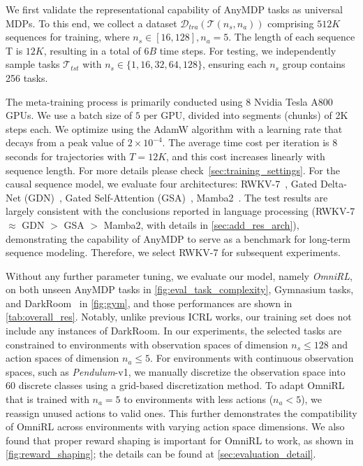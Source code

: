 \documentclass{article}
\renewcommand{\cite}[1]{\citep{#1}}
\begin{document}
We first validate the representational capability of AnyMDP tasks as universal MDPs. To this end, we collect a dataset $\mathcal{D}_{tra}(\mathcal{T}(n_s,n_a))$ comprising $512K$ sequences for training, where  $n_s\in[16, 128], n_a=5$. The length of each sequence T is $12K$, resulting in a total of $6B$ time steps. For testing, we independently sample tasks $\mathcal{T}_{tst}$ with $n_s\in\{1, 16, 32, 64, 128\}$, ensuring each $n_s$ group contains 256 tasks. 

The meta-training process is primarily conducted using 8 Nvidia Tesla A800 GPUs. We use a batch size of $5$ per GPU, divided into segments (chunks) of 2K steps each. We optimize using the AdamW algorithm with a learning rate that decays from a peak value of $2\times10^{-4}$. The average time cost per iteration is $8$ seconds for trajectories with $T=12K$, and this cost increases linearly with sequence length. For more details please check~\cref{sec:training_settings}. For the causal sequence model, we evaluate four architectures: RWKV-7~\cite{peng2025rwkv}, Gated Delta-Net (GDN)~\cite{yang2025gated}, Gated Self-Attention (GSA)~\cite{zhanggated}, Mamba2~\cite{dao2024transformers}. 
The test results are largely consistent with the conclusions reported in language processing (RWKV-7 $\approx$ GDN $>$  GSA $>$ Mamba2, with details in \cref{sec:add_res_arch}), demonstrating the capability of AnyMDP to serve as a benchmark for long-term sequence modeling. Therefore, we select RWKV-7 for subsequent experiments.

Without any further parameter tuning, we evaluate our model, namely \emph{OmniRL}, on both unseen AnyMDP tasks in \cref{fig:eval_task_complexity}, Gymnasium tasks, and DarkRoom~\cite{laskin2022context} in \cref{fig:gym}, and those performances are shown in \cref{tab:overall_res}. Notably, unlike previous ICRL works, our training set does not include any instances of DarkRoom. In our experiments, the selected tasks are constrained to environments with observation spaces of dimension $n_s \leq 128$ and action spaces of dimension $n_a \leq 5$. For environments with continuous observation spaces, such as \emph{Pendulum}-v1, we manually discretize the observation space into 60 discrete classes using a grid-based discretization method. To adapt OmniRL that is trained with $n_a=5$ to environments with less actions ($n_a<5$), we reassign unused actions to valid ones. 
This further demonstrates the compatibility of OmniRL across environments with varying action space dimensions. We also found that proper reward shaping is important for OmniRL to work, as shown in  \cref{fig:reward_shaping}; the details can be found at \cref{sec:evaluation_detail}.
\end{document}
